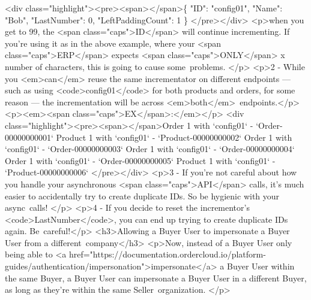 \documentclass{memoir}%
\begin{document}
<div class="highlight"><pre><span></span>\{\newline%
  "ID": "config01",\newline%
  "Name": "Bob",\newline%
  "LastNumber": 0,\newline%
  "LeftPaddingCount": 1 \newline%
\}\newline%
</pre></div>\newline%
<p>when you get to 99, the <span class="caps">ID</span> will continue incrementing. If you’re using it as in the above example, where your <span class="caps">ERP</span> expects <span class="caps">ONLY</span> x number of characters, this is going to cause some~problems. </p>\newline%
<p>2 {-} While you <em>can</em> reuse the same incrementator on different endpoints — such as using <code>config01</code> for both products and orders, for some reason — the incrementation will be across <em>both</em>~endpoints.</p>\newline%
<p><em><span class="caps">EX</span>:</em></p>\newline%
<div class="highlight"><pre><span></span>Order 1 with `config01` {-} `Order{-}00000000001`\newline%
Product 1 with `config01` {-} `Product{-}00000000002`\newline%
Order 1 with `config01` {-} `Order{-}00000000003`\newline%
Order 1 with `config01` {-} `Order{-}00000000004`\newline%
Order 1 with `config01` {-} `Order{-}00000000005`\newline%
Product 1 with `config01` {-} `Product{-}00000000006`\newline%
</pre></div>\newline%
<p>3 {-} If you’re not careful about how you handle your asynchronous <span class="caps">API</span> calls, it’s much easier to accidentally try to create duplicate IDs. So be hygienic with your async~calls! </p>\newline%
<p>4 {-} If you decide to reset the incrementor’s <code>LastNumber</code>, you can end up trying to create duplicate IDs again. Be~careful!</p>\newline%
<h3>Allowing a Buyer User to impersonate a Buyer User from a different~company</h3>\newline%
<p>Now, instead of a Buyer User only being able to <a href="https://documentation.ordercloud.io/platform{-}guides/authentication/impersonation">impersonate</a> a Buyer User within the same Buyer, a Buyer User can impersonate a Buyer User in a different Buyer, as long as they’re within the same Seller~organization. </p>\newline%
\end{document}
